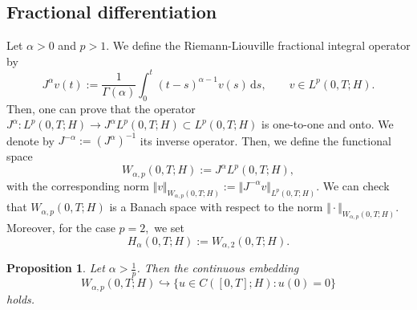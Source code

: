 \documentclass[reqno]{amsart}
\newtheorem{prop}[theorem]{Proposition}
\numberwithin{equation}{section}
\def \d {\mathrm{d}}
\begin{document}
\subsection{Fractional differentiation}\label{sec22}
Let $\alpha > 0$ and $p>1$. We define the Riemann-Liouville fractional integral operator by
\begin{equation}
J^{\alpha}v(t):= \frac{1}{\Gamma(\alpha)}\int^t_0 (t-s)^{\alpha-1}
v(s)\, \d s, \qquad v\in L^p(0,T;H).
\end{equation}
Then, one can prove that the operator $J^{\alpha}: L^p(0,T;H) \rightarrow J^{\alpha}L^p(0,T;H)\subset L^p(0,T;H)$ is one-to-one and 
onto. We denote by $J^{-\alpha}:=(J^{\alpha})^{-1}$ its inverse operator. Then, we define the functional space  
\begin{equation}
W_{\alpha,p}(0,T;H) := J^{\alpha}L^p(0,T;H),
\end{equation}
with the corresponding norm $\Vert v\Vert_{W_{\alpha,p}(0,T;H)}:= \Vert J^{-\alpha}v \Vert_{L^p(0,T;H)}$.
We can check that $W_{\alpha,p}(0,T;H)$ is a Banach space with respect to the norm $\Vert \cdot\Vert_{W_{\alpha,p}(0,T;H)}$. Moreover, for the case $p=2,$ we set
$$H_{\alpha}(0,T;H):=W_{\alpha,2}(0,T;H).$$
\begin{prop} \label{fractional_space}
Let $\alpha>\frac{1}{p}$. Then the continuous embedding
$$W_{\alpha,p}(0,T;H) \hookrightarrow \{u\in C([0,T];H) \colon u(0)=0\}$$
holds.
\end{prop}
\end{document}

